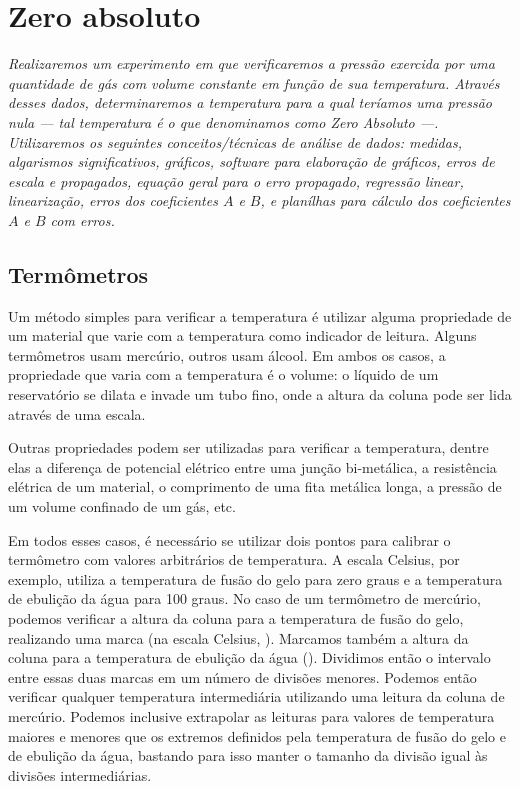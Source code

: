 \chapter{Zero absoluto}
\label{Chap:ExpZeroAbsoluto}

\begin{fullwidth}\it
	Realizaremos um experimento em que verificaremos a pressão exercida por uma quantidade de gás com volume constante em função de sua temperatura. Através desses dados, determinaremos a temperatura para a qual teríamos uma pressão nula --- tal temperatura é o que denominamos como Zero Absoluto ---. Utilizaremos os seguintes conceitos/técnicas de análise de dados: medidas, algarismos significativos, gráficos, software para elaboração de gráficos, erros de escala e propagados, equação geral para o erro propagado, regressão linear, linearização, erros dos coeficientes $A$ e $B$, e planílhas para cálculo dos coeficientes $A$ e $B$ com erros.
\end{fullwidth}

\section{Termômetros}

Um método simples para verificar a temperatura é utilizar alguma propriedade de um material que varie com a temperatura como indicador de leitura. Alguns termômetros usam mercúrio, outros usam álcool. Em ambos os casos, a propriedade que varia com a temperatura é o volume: o líquido de um reservatório se dilata e invade um tubo fino, onde a altura da coluna pode ser lida através de uma escala.

Outras propriedades podem ser utilizadas para verificar a temperatura, dentre elas a diferença de potencial elétrico entre uma junção bi-metálica, a resistência elétrica de um material, o comprimento de uma fita metálica longa, a pressão de um volume confinado de um gás, etc. 

Em todos esses casos, é necessário se utilizar dois pontos para calibrar o termômetro com valores arbitrários de temperatura. A escala Celsius, por exemplo, utiliza a temperatura de fusão do gelo para zero graus e a temperatura de ebulição da água para 100 graus. No caso de um termômetro de mercúrio, podemos verificar a altura da coluna para a temperatura de fusão do gelo, realizando uma marca (na escala Celsius, ). Marcamos também a altura da coluna para a temperatura de ebulição da água (). Dividimos então o intervalo entre essas duas marcas em um número de divisões menores. Podemos então verificar qualquer temperatura intermediária utilizando uma leitura da coluna de mercúrio. Podemos inclusive extrapolar as leituras para valores de temperatura maiores e menores que os extremos definidos pela temperatura de fusão do gelo e de ebulição da água, bastando para isso manter o tamanho da divisão igual às divisões intermediárias.

